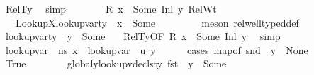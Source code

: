 \begin{isabellebody}
\ RelTy\ \isamarkupfalse%
\ simp\isanewline
\ \ \ \ \isamarkupfalse%
\ \isamarkupfalse%
\ {\isacartoucheopen}R\ x\ {\isacharequal}{\kern0pt}\ Some\ {\isacharparenleft}{\kern0pt}Inl\ y{\isacharparenright}{\kern0pt}{\isacartoucheclose}\ RelWt\ \isamarkupfalse%
\ {\isasymtau}\ \ LookupX{\isacharcolon}{\kern0pt}{\isachardoublequoteopen}lookup{\isacharunderscore}{\kern0pt}var{\isacharunderscore}{\kern0pt}ty\ {\isasymLambda}\ x\ {\isacharequal}{\kern0pt}\ Some\ {\isasymtau}{\isachardoublequoteclose}\isanewline
\ \ \ \ \ \ \isamarkupfalse%
\ {\isacharparenleft}{\kern0pt}meson\ rel{\isacharunderscore}{\kern0pt}well{\isacharunderscore}{\kern0pt}typed{\isacharunderscore}{\kern0pt}def{\isacharparenright}{\kern0pt}\isanewline
\ \ \ \ \isamarkupfalse%
\ {\isachardoublequoteopen}lookup{\isacharunderscore}{\kern0pt}var{\isacharunderscore}{\kern0pt}ty\ {\isasymLambda}{\isacharprime}{\kern0pt}\ y\ {\isacharequal}{\kern0pt}\ Some\ {\isasymtau}{\isachardoublequoteclose}\ \isamarkupfalse%
\ RelTy{\isacharbrackleft}{\kern0pt}OF\ {\isacartoucheopen}R\ x\ {\isacharequal}{\kern0pt}\ Some\ {\isacharparenleft}{\kern0pt}Inl\ y{\isacharparenright}{\kern0pt}{\isacartoucheclose}{\isacharbrackright}{\kern0pt}\ \isamarkupfalse%
\ simp\ \ \ \ \isanewline
\ \ \ \ \isamarkupfalse%
\ {\isachardoublequoteopen}lookup{\isacharunderscore}{\kern0pt}var\ {\isasymLambda}\ ns\ x\ {\isacharequal}{\kern0pt}\ lookup{\isacharunderscore}{\kern0pt}var\ {\isasymLambda}{\isacharprime}{\kern0pt}\ {\isacharquery}{\kern0pt}u\ y{\isachardoublequoteclose}\isanewline
\ \ \ \ \isamarkupfalse%
\ {\isacharparenleft}{\kern0pt}cases\ {\isachardoublequoteopen}map{\isacharunderscore}{\kern0pt}of\ {\isacharparenleft}{\kern0pt}snd\ {\isasymLambda}{\isacharprime}{\kern0pt}{\isacharparenright}{\kern0pt}\ y\ {\isacharequal}{\kern0pt}\ None{\isachardoublequoteclose}{\isacharparenright}{\kern0pt}\isanewline
\ \ \ \ \ \ \isamarkupfalse%
\ True\isanewline
\ \ \ \ \ \ \isamarkupfalse%
\ global{\isacharunderscore}{\kern0pt}y{\isacharcolon}{\kern0pt}{\isachardoublequoteopen}lookup{\isacharunderscore}{\kern0pt}vdecls{\isacharunderscore}{\kern0pt}ty\ {\isacharparenleft}{\kern0pt}fst\ {\isasymLambda}{\isacharprime}{\kern0pt}{\isacharparenright}{\kern0pt}\ y\ {\isacharequal}{\kern0pt}\ Some\ {\isasymtau}{\isachardoublequoteclose}\ \isamarkupfalse%

\end{isabellebody}
